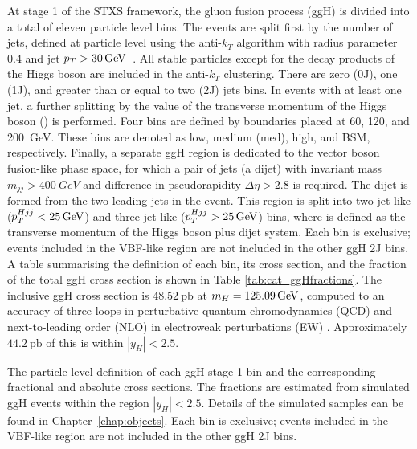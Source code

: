 At stage 1 of the STXS framework, 
the gluon fusion process (ggH) is divided into a total of eleven particle level bins.
The events are split first by the number of jets, 
defined at particle level using the anti-$k_T$ algorithm with radius parameter 0.4 
and jet $p_T > \SI{30}{GeV}$~\cite{AntiKt}.
All stable particles except for the decay products of the Higgs boson 
are included in the anti-$k_T$ clustering.
There are zero (0J), one (1J), and greater than or equal to two (2J) jets bins.
In events with at least one jet, a further splitting 
by the value of the transverse momentum of the Higgs boson (\ptH) is performed. 
Four bins are defined by boundaries placed at 60, 120, and \SI{200}{GeV}.
These bins are denoted as low, medium (med), high, and BSM, respectively.
Finally, a separate ggH region is dedicated to the vector boson fusion-like phase space, 
for which a pair of jets (a dijet) with invariant mass $m_{jj} > \SI{400}{GeV}$ 
and difference in pseudorapidity $\Delta\eta > 2.8$ is required.
The dijet is formed from the two leading jets in the event.
This region is split into two-jet-like ($p_T^{Hjj} < \SI{25}{GeV}$) 
and three-jet-like ($p_T^{Hjj} > \SI{25}{GeV}$) bins, 
where \ptHjj is defined as the transverse momentum of the Higgs boson plus dijet system.
Each bin is exclusive; events included in the VBF-like region are not included in the other ggH 2J bins.
A table summarising the definition of each bin, its cross section, and the fraction of the 
total ggH cross section is shown in Table \ref{tab:cat_ggHfractions}.
The inclusive ggH cross section is $48.52~\textrm{pb}$ at $m_{H} = \SI{125.09}{GeV}$, 
computed to an accuracy of three loops in perturbative quantum chromodynamics (QCD) 
and next-to-leading order (NLO) in electroweak perturbations (EW) 
\cite{YR4,Anastasiou2015,Anastasiou2016}.
Approximately $44.2~\textrm{pb}$ of this is within $|y_H| < 2.5$.

\begin{table}
  \begin{centering}
    
    \caption{The particle level definition of each ggH stage 1 bin 
    and the corresponding fractional and absolute cross sections.
    The fractions are estimated from simulated ggH \Hgg events 
    within the region $|y_H| < 2.5$.
    Details of the simulated samples can be found in Chapter~\ref{chap:objects}.
    Each bin is exclusive; 
    events included in the VBF-like region are not included in the other ggH 2J bins.
    }
    \label{tab:cat_ggHfractions}
  \end{centering}
\end{table}

